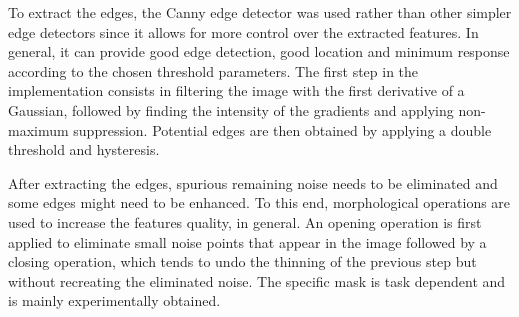 \documentclass[conference]{IEEEtran}
\begin{document}
To extract the edges, the Canny edge detector was used rather than other simpler edge detectors since it allows for more control over the extracted features. In general, it can provide good edge detection, good location and minimum response according to the chosen threshold parameters. The first step in the implementation consists in filtering the image with the first derivative of a Gaussian, followed by finding the intensity of the gradients and applying non-maximum suppression. Potential edges are then obtained by applying a double threshold and hysteresis.

After extracting the edges, spurious remaining noise needs to be eliminated and some edges might need to be enhanced. To this end, morphological operations are used to increase the features quality, in general. An opening operation is first applied to eliminate small noise points that appear in the image followed by a closing operation, which tends to undo the thinning of the previous step but without recreating the eliminated noise. The specific mask is task dependent and is mainly experimentally obtained.
\end{document}
